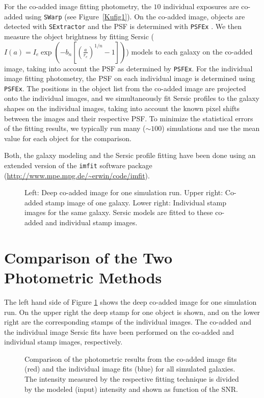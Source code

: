 For the co-added image fitting photometry, the $10$ individual exposures are co-added using {\tt SWarp} (see Figure~\ref{Kufig1}). On the co-added image, objects are detected with {\tt SExtractor}  and the PSF is determined with {\tt PSFEx} \citep{2011ASPC..442..435B}. We then measure the object brightness by fitting Sersic ($I(a) = I_e \exp(-b_n[(\frac{a}{r_e})^{1/n}-1])$) models to each galaxy on the co-added image, taking into account the PSF as determined by {\tt PSFEx}. For the individual image fitting photometry, the PSF on each individual image is determined using {\tt PSFEx}. The positions in the object list from the co-added image are projected onto the individual images, and we simultaneously fit Sersic profiles to the galaxy shapes on the individual images, taking into account the known pixel shifts between the images and their respective PSF. To minimize the statistical errors of the fitting results, we typically run many ($\sim100$) simulations and use the mean value for each object for the comparison.

Both, the galaxy modeling and the Sersic profile fitting have been done using an extended version of the {\tt imfit} software package (\url{http://www.mpe.mpg.de/~erwin/code/imfit}). 
\begin{figure}[t]
\caption{Left: Deep co-added image for one simulation run. Upper right: Co-added stamp image of one galaxy. Lower right: Individual stamp images for the same galaxy. Sersic models are fitted to these co-added and individual stamp images.}
\label{fig2}
\end{figure}

\section{Comparison of the Two Photometric Methods}
The left hand side of Figure \ref{fig2} shows the deep co-added image for one simulation run. On the upper right the deep stamp for one object is shown, and on the lower right are the corresponding stamps of the individual images. The co-added and the individual image Sersic fits have been performed on the co-added and individual stamp images, respectively.
\begin{figure}[t]
\caption{Comparison of the photometric results from the co-added image fits (red) and the individual image fits (blue) for all simulated galaxies. The intensity measured by the respective fitting technique is divided by the modeled (input) intensity and shown as function of the SNR.}
\label{fig3}
\end{figure}

